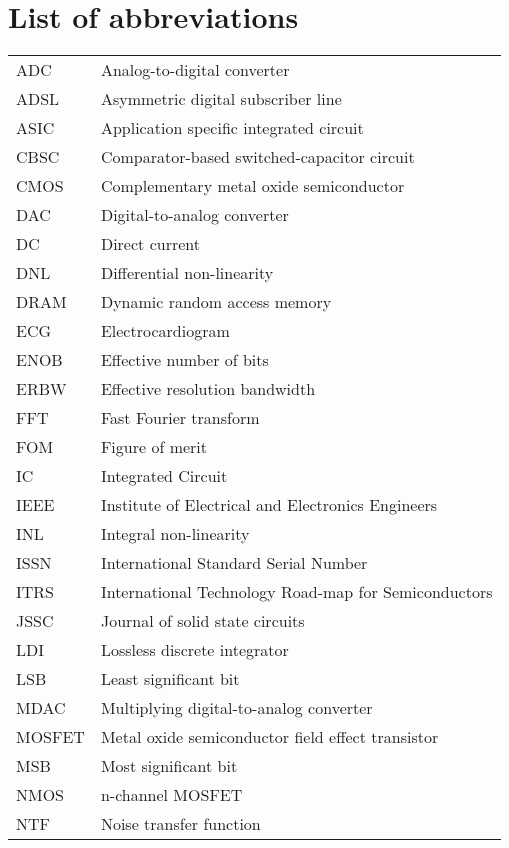 
\chapter*{List of abbreviations} 
\begin{table}[h]
\begin{tabular}{l l}
ADC & Analog-to-digital converter\\
ADSL & Asymmetric digital subscriber line\\
ASIC & Application specific integrated circuit\\
CBSC & Comparator-based switched-capacitor circuit\\
CMOS & Complementary metal oxide semiconductor\\
DAC & Digital-to-analog converter\\
DC & Direct current\\
DNL & Differential non-linearity\\
DRAM & Dynamic random access memory\\
ECG & Electrocardiogram\\
ENOB & Effective number of bits\\
ERBW & Effective resolution bandwidth\\
FFT & Fast Fourier transform\\
FOM & Figure of merit\\
IC & Integrated Circuit\\
IEEE & Institute of Electrical and Electronics Engineers\\
INL & Integral non-linearity\\
ISSN & International Standard Serial Number\\
ITRS & International Technology Road-map for Semiconductors\\
JSSC & Journal of solid state circuits\\
LDI & Lossless discrete integrator\\
LSB & Least significant bit\\
MDAC & Multiplying digital-to-analog converter\\
MOSFET & Metal oxide semiconductor field effect transistor\\
MSB & Most significant bit\\
NMOS & n-channel MOSFET\\
NTF & Noise transfer function\\

\end{tabular}
\end{table}
